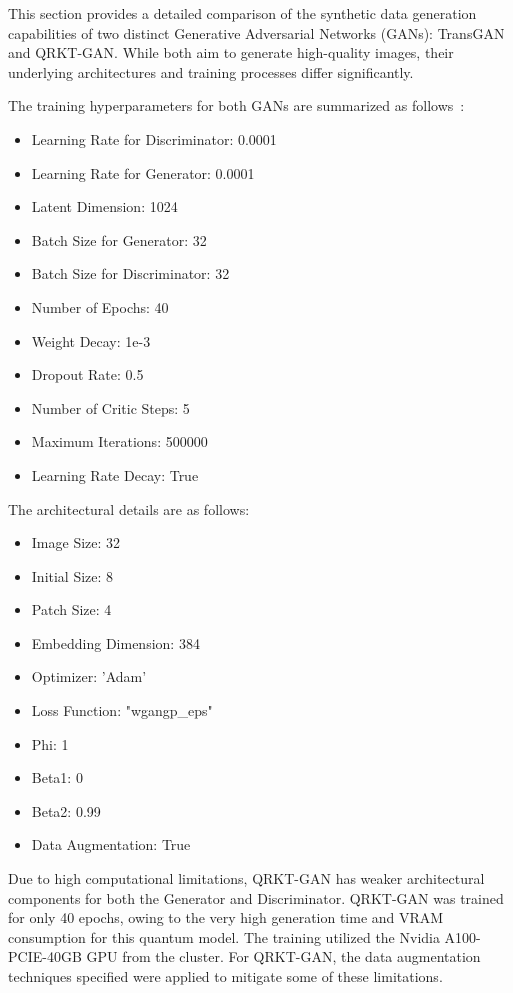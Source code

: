 \documentclass[12pt,a4paper]{report}
\begin{document}
This section provides a detailed comparison of the synthetic data generation capabilities of two distinct Generative Adversarial Networks (GANs): TransGAN and QRKT-GAN. While both aim to generate high-quality images, their underlying architectures and training processes differ significantly.

The training hyperparameters for both GANs are summarized as follows~\cite{ahmet_sarigun_2024_10806360}:

\begin{itemize}
  \item Learning Rate for Discriminator: 0.0001
  \item Learning Rate for Generator: 0.0001
  \item Latent Dimension: 1024
  \item Batch Size for Generator: 32
  \item Batch Size for Discriminator: 32
  \item Number of Epochs: 40
  \item Weight Decay: 1e-3
  \item Dropout Rate: 0.5
  \item Number of Critic Steps: 5
  \item Maximum Iterations: 500000
  \item Learning Rate Decay: True
\end{itemize}

The architectural details are as follows:

\begin{itemize}
  \item Image Size: 32
  \item Initial Size: 8
  \item Patch Size: 4
  \item Embedding Dimension: 384
  \item Optimizer: 'Adam'
  \item Loss Function: "wgangp\_eps"
  \item Phi: 1
  \item Beta1: 0
  \item Beta2: 0.99
  \item Data Augmentation: True
\end{itemize}

Due to high computational limitations, QRKT-GAN has weaker architectural components for both the Generator and Discriminator. QRKT-GAN was trained for only 40 epochs, owing to the very high generation time and VRAM consumption for this quantum model. The training utilized the Nvidia A100-PCIE-40GB GPU from the cluster. For QRKT-GAN, the data augmentation techniques specified were applied to mitigate some of these limitations.
\end{document}
